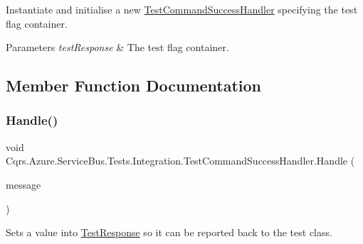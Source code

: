 Instantiate and initialise a new \hyperlink{classCqrs_1_1Azure_1_1ServiceBus_1_1Tests_1_1Integration_1_1TestCommandSuccessHandler}{Test\+Command\+Success\+Handler} specifying the test flag container. 


\begin{DoxyParams}{Parameters}
{\em test\+Response} & The test flag container.\\
\hline
\end{DoxyParams}


\subsection{Member Function Documentation}
\mbox{\label{classCqrs_1_1Azure_1_1ServiceBus_1_1Tests_1_1Integration_1_1TestCommandSuccessHandler_a235fa7b6ffe7108a47e33d5eb1c4fa49_a235fa7b6ffe7108a47e33d5eb1c4fa49}} 
\subsubsection{\texorpdfstring{Handle()}{Handle()}}
{\footnotesize\ttfamily void Cqrs.\+Azure.\+Service\+Bus.\+Tests.\+Integration.\+Test\+Command\+Success\+Handler.\+Handle (\begin{DoxyParamCaption}\item[{\hyperlink{classCqrs_1_1Azure_1_1ServiceBus_1_1Tests_1_1Unit_1_1TestCommand}{Test\+Command}}]{message }\end{DoxyParamCaption})}



Sets a value into \hyperlink{classCqrs_1_1Azure_1_1ServiceBus_1_1Tests_1_1Integration_1_1TestCommandSuccessHandler_a2e843e55bab5553cd1ecfaa330d76ef2_a2e843e55bab5553cd1ecfaa330d76ef2}{Test\+Response} so it can be reported back to the test class. 




